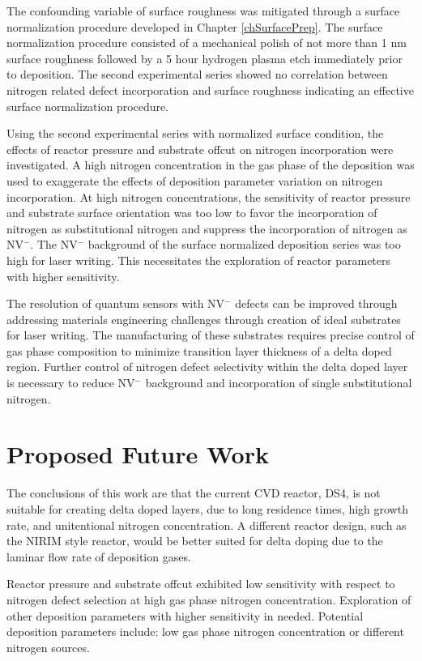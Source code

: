 The confounding variable of surface roughness was mitigated through a surface normalization procedure developed in Chapter \ref{chSurfacePrep}. The surface normalization procedure consisted of a mechanical polish of not more than 1 nm surface roughness followed by a 5 hour hydrogen plasma etch immediately prior to deposition. The second experimental series showed no correlation between nitrogen related defect incorporation and surface roughness indicating an effective surface normalization procedure.

Using the second experimental series with normalized surface condition, the effects of reactor pressure and substrate offcut on nitrogen incorporation were investigated. A high nitrogen concentration in the gas phase of the deposition was used to exaggerate the effects of deposition parameter variation on nitrogen incorporation. At high nitrogen concentrations, the sensitivity of reactor pressure and substrate surface orientation was too low to favor the incorporation of nitrogen as substitutional nitrogen and suppress the incorporation of nitrogen as NV$^-$. The NV$^-$ background of the surface normalized deposition series was too high for laser writing. This necessitates the exploration of reactor parameters with higher sensitivity.

The resolution of quantum sensors with NV$^-$ defects can be improved through addressing materials engineering challenges through creation of ideal substrates for laser writing. The manufacturing of these substrates requires precise control of gas phase composition to minimize transition layer thickness of a delta doped region. Further control of nitrogen defect selectivity within the delta doped layer is necessary to reduce NV$^-$ background and incorporation of single substitutional nitrogen.

\section{Proposed Future Work}
\indent
 
The conclusions of this work are that the current CVD reactor, DS4, is not suitable for creating delta doped layers, due to long residence times, high growth rate, and unitentional nitrogen concentration. A different reactor design, such as the NIRIM style reactor, would be better suited for delta doping due to the laminar flow rate of deposition gases. 

Reactor pressure and substrate offcut exhibited low sensitivity with respect to nitrogen defect selection at high gas phase nitrogen concentration. Exploration of other deposition parameters with higher sensitivity in needed. Potential deposition parameters include: low gas phase nitrogen concentration or different nitrogen sources.

